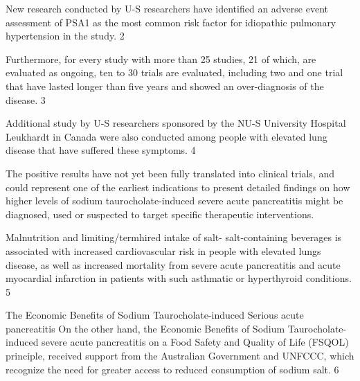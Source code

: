 \documentclass{article}
\begin{document}
New research conducted by U-S researchers have identified an adverse event assessment of PSA1 as the most common risk factor for idiopathic pulmonary hypertension in the study. 2

Furthermore, for every study with more than 25 studies, 21 of which, are evaluated as ongoing, ten to 30 trials are evaluated, including two and one trial that have lasted longer than five years and showed an over-diagnosis of the disease. 3

Additional study by U-S researchers sponsored by the NU-S University Hospital Leukhardt in Canada were also conducted among people with elevated lung disease that have suffered these symptoms. 4

The positive results have not yet been fully translated into clinical trials, and could represent one of the earliest indications to present detailed findings on how higher levels of sodium taurocholate-induced severe acute pancreatitis might be diagnosed, used or suspected to target specific therapeutic interventions.

Malnutrition and limiting/termhired intake of salt- salt-containing beverages is associated with increased cardiovascular risk in people with elevated lungs disease, as well as increased mortality from severe acute pancreatitis and acute myocardial infarction in patients with such asthmatic or hyperthyroid conditions. 5

The Economic Benefits of Sodium Taurocholate-induced Serious acute pancreatitis On the other hand, the Economic Benefits of Sodium Taurocholate-induced severe acute pancreatitis on a Food Safety and Quality of Life (FSQOL) principle, received support from the Australian Government and UNFCCC, which recognize the need for greater access to reduced consumption of sodium salt. 6
\end{document}
